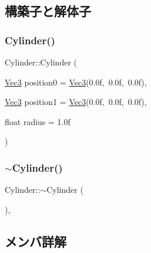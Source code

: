 \subsection{構築子と解体子}
\mbox{\label{class_cylinder_a642d2ea21539b8a35ed8c79f36615f6f}} 
\subsubsection{\texorpdfstring{Cylinder()}{Cylinder()}}
{\footnotesize\ttfamily Cylinder\+::\+Cylinder (\begin{DoxyParamCaption}\item[{\mbox{\hyperlink{_vector3_d_8h_ab16f59e4393f29a01ec8b9bbbabbe65d}{Vec3}}}]{position0 = {\ttfamily \mbox{\hyperlink{_vector3_d_8h_ab16f59e4393f29a01ec8b9bbbabbe65d}{Vec3}}(0.0f,~0.0f,~0.0f)},  }\item[{\mbox{\hyperlink{_vector3_d_8h_ab16f59e4393f29a01ec8b9bbbabbe65d}{Vec3}}}]{position1 = {\ttfamily \mbox{\hyperlink{_vector3_d_8h_ab16f59e4393f29a01ec8b9bbbabbe65d}{Vec3}}(0.0f,~0.0f,~0.0f)},  }\item[{float}]{radius = {\ttfamily 1.0f} }\end{DoxyParamCaption})\hspace{0.3cm}{\ttfamily [inline]}}

\mbox{\label{class_cylinder_a05ab556f0ae3cd6e99d9d1f3caca80b3}} 
\subsubsection{\texorpdfstring{$\sim$\+Cylinder()}{~Cylinder()}}
{\footnotesize\ttfamily Cylinder\+::$\sim$\+Cylinder (\begin{DoxyParamCaption}{ }\end{DoxyParamCaption})\hspace{0.3cm}{\ttfamily [inline]}, {\ttfamily [virtual]}}



\subsection{メンバ詳解}
\mbox{\label{class_cylinder_ade5211259c6543ae77c4707b1ec26538}} 
